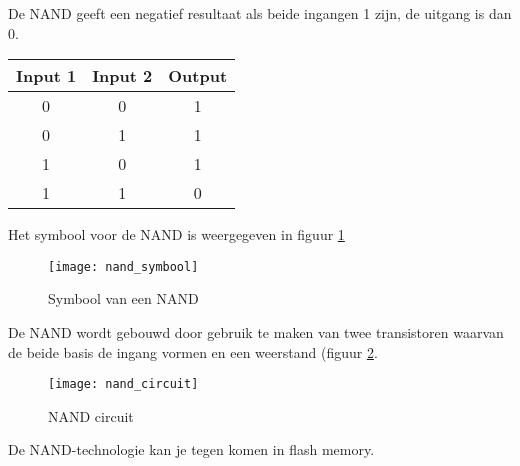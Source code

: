 De NAND geeft een negatief resultaat als beide ingangen 1 zijn, de uitgang is dan 0.

\begin{tabular}{ |c|c|c| }
\hline
\rowcolor{gray!60}
	Input 1 & Input 2 & Output \\
	\hline
	0 & 0 & 1 \\
	\hline
	0 & 1 & 1 \\
	\hline
	1 & 0 & 1 \\
	\hline
	1 & 1 & 0 \\
	\hline
\end{tabular}

Het symbool voor de NAND is weergegeven in figuur \ref{symbool:nand}

\begin{figure}[h]
\texttt{[image: nand\_symbool]}
\centering
\caption{Symbool van een NAND}
\label{symbool:nand}
\end{figure}

De NAND wordt gebouwd door gebruik te maken van twee transistoren waarvan de beide basis de ingang vormen en een weerstand (figuur \ref{circuit:nand}.

\begin{figure}[h]
\texttt{[image: nand\_circuit]}
\centering
\caption{NAND circuit}
\label{circuit:nand}
\end{figure}

De NAND-technologie kan je tegen komen in flash memory.

